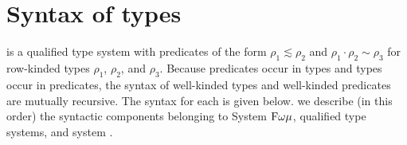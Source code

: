 \documentclass[authoryear, acmsmall, screen, review, nonacm]{acmart}
\begin{document}
\begin{code}%
\>[0]\AgdaSpace{}%
\AgdaSpace{}%
\AgdaSymbol{:}\AgdaSpace{}%
\AgdaSpace{}%
\AgdaSpace{}%
\AgdaSpace{}%
\AgdaSpace{}%
\AgdaSpace{}%
\<%
\\
\>[0][@{}l@{\AgdaIndent{0}}]%
\>[2]\AgdaSpace{}%
\AgdaSymbol{:}\AgdaSpace{}%
\AgdaSpace{}%
\AgdaSymbol{(}\AgdaSpace{}%
\AgdaOperator{\AgdaInductiveConstructor{,,}}\AgdaSpace{}%
\AgdaSymbol{)}\AgdaSpace{}%
\<%
\\
%
\>[2]\AgdaSpace{}%
\AgdaSymbol{:}\AgdaSpace{}%
\AgdaSpace{}%
\AgdaSpace{}%
\AgdaSpace{}%
\AgdaSpace{}%
\AgdaSpace{}%
\AgdaSymbol{(}\AgdaSpace{}%
\AgdaOperator{\AgdaInductiveConstructor{,,}}\AgdaSpace{}%
\AgdaSymbol{)}\AgdaSpace{}%
\<%
\end{code}

\section{Syntax of types}

\Rome is a qualified type system with predicates of the form $\rho_1 \lesssim \rho_2$ and $\rho_1 \cdot \rho_2 \sim \rho_3$ for row-kinded types $\rho_1$, $\rho_2$, and $\rho_3$. Because predicates occur in types and types occur in predicates, the syntax of well-kinded types and well-kinded predicates are mutually recursive. The syntax for each is given below. we describe (in this order) the syntactic components belonging to System $\textrm{F$\omega\mu$}$, qualified type systems, and system \RO.

\begin{code}[hide]%
\>[0]\AgdaSpace{}%
\AgdaSpace{}%
\AgdaSpace{}%
\AgdaSpace{}%
\AgdaSymbol{(}\AgdaSymbol{)}\<%
\\
\>[0]\AgdaSpace{}%
\AgdaSymbol{=}\AgdaSpace{}%
\<%
\\
%
\\[\AgdaEmptyExtraSkip]%
\>[0]\AgdaSpace{}%
\AgdaSpace{}%
\<%
\\
\>[0]\AgdaSpace{}%
\AgdaSpace{}%
\<%
\end{code}
\end{document}
